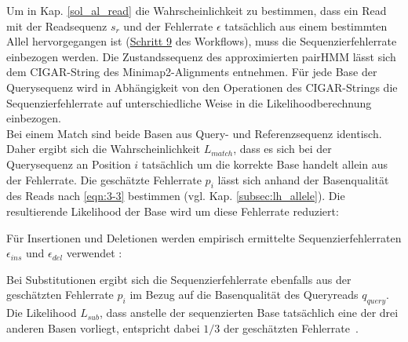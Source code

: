 Um in Kap. \ref{sol_al_read} die Wahrscheinlichkeit zu bestimmen, dass ein Read mit der Readsequenz $s_{r}$ und der Fehlerrate $\epsilon$ tatsächlich aus einem bestimmten Allel hervorgegangen ist (\hyperref[step9]{Schritt 9\label{step9txt}} des Workflows), muss die Sequenzierfehlerrate einbezogen werden. Die Zustandssequenz des approximierten pairHMM lässt sich dem CIGAR-String des Minimap2-Alignments entnehmen. Für jede Base der Querysequenz wird in Abhängigkeit von den Operationen des CIGAR-Strings die Sequenzierfehlerrate auf unterschiedliche Weise in die Likelihoodberechnung einbezogen. \\

Bei einem Match sind beide Basen aus Query- und Referenzsequenz identisch. Daher ergibt sich die Wahrscheinlichkeit $L_{match}$, dass es sich bei der Querysequenz an Position $i$ tatsächlich um die korrekte Base handelt allein aus der Fehlerrate. Die geschätzte Fehlerrate $ p_{i} $ lässt sich anhand der Basenqualität des Reads nach \eqref{eqn:3-3} bestimmen (vgl. Kap. \ref{subsec:lh_allele}). Die resultierende Likelihood der Base wird um diese Fehlerrate reduziert:
\vspace{-0.5cm}
\begin{center}
\end{center}
Für Insertionen und Deletionen werden empirisch ermittelte Sequenzierfehlerraten $\epsilon_{ins}$ und $\epsilon_{del}$ verwendet \cite{schirmer_2016}: 
\vspace{-0.5cm}
\begin{center}
\end{center}

Bei Substitutionen ergibt sich die Sequenzierfehlerrate ebenfalls aus der geschätzten Fehlerrate $p_{i}$ im Bezug auf die Basenqualität des Queryreads $q_{query}$. Die Likelihood $L_{sub}$, dass anstelle der sequenzierten Base tatsächlich eine der drei anderen Basen vorliegt, entspricht dabei $ 1/3 $ der geschätzten Fehlerrate~\cite{kuhner_2014}.
\vspace{-0.5cm}
\begin{center}
\end{center}

